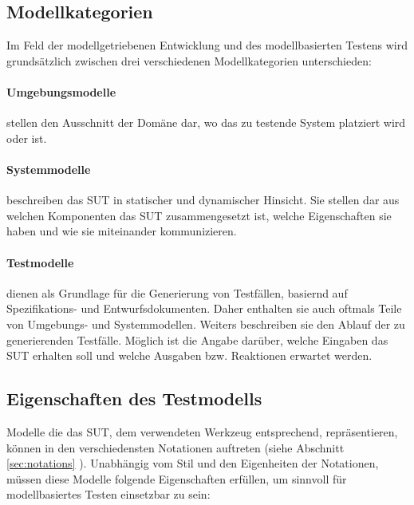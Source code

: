 \subsection{Modellkategorien}
Im Feld der modellgetriebenen Entwicklung und des modellbasierten Testens wird grundsätzlich zwischen drei verschiedenen Modellkategorien unterschieden:

\paragraph{Umgebungsmodelle} stellen den Ausschnitt der Domäne dar, wo das zu testende System platziert wird oder ist.
\paragraph{Systemmodelle} beschreiben das \Gls{SUT} in statischer und dynamischer Hinsicht. Sie stellen dar aus welchen Komponenten das \Gls{SUT} zusammengesetzt ist, welche Eigenschaften sie haben und wie sie miteinander kommunizieren. 
\paragraph{Testmodelle} dienen als Grundlage für die Generierung von Testfällen, basiernd auf Spezifikations- und Entwurfsdokumenten. Daher enthalten sie auch oftmals Teile von Umgebungs- und Systemmodellen. Weiters beschreiben sie den Ablauf der zu generierenden Testfälle. Möglich ist die Angabe darüber, welche Eingaben das \Gls{SUT} erhalten soll und welche Ausgaben bzw. Reaktionen erwartet werden.

\subsection{Eigenschaften des Testmodells} 
\label{sec:eigenschaften_modell}
Modelle die das \gls{SUT}, dem verwendeten Werkzeug entsprechend, repräsentieren, können in den verschiedensten Notationen auftreten (siehe Abschnitt \ref{sec:notations} ). Unabhängig vom Stil und den Eigenheiten der Notationen, müssen diese Modelle folgende Eigenschaften erfüllen, um sinnvoll für modellbasiertes Testen einsetzbar zu sein:\\

